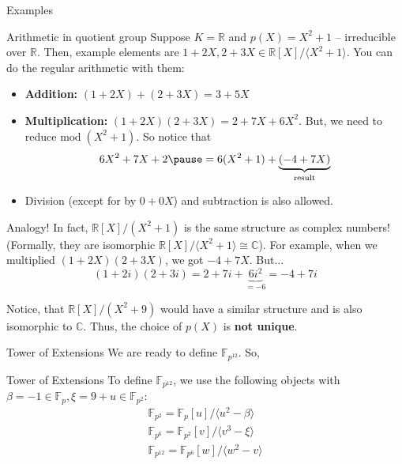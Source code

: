 \documentclass[xcolor={usenames,dvipsnames}]{beamer}
\begin{document}
    \begin{frame}{Examples}
        \begin{exampleblock}{Arithmetic in quotient group}
            Suppose $K=\mathbb{R}$ and $p(X)=X^2+1$ -- irreducible over $\mathbb{R}$. Then, example elements are $1+2X,2+3X \in \mathbb{R}[X]/\langle X^2+1 \rangle$. You can do the regular arithmetic with them:\pause
            \begin{itemize}
                \item \textbf{Addition:} $(1+2X)+(2+3X)=3+5X$ \pause
                \item \textbf{Multiplication:} $(1+2X)(2+3X)=2+7X+6X^2$. But, we need to reduce $\text{mod} \; (X^2+1)$. So notice that
                \begin{equation*}
                    6X^2+7X+2 \pause = 6(X^2+1) + \underbrace{(-4+7X)}_{\text{result}}
                \end{equation*}
                \item \pause Division (except for by $0+0X$) and subtraction is also allowed.
            \end{itemize}
        \end{exampleblock}
    \end{frame}

    \begin{frame}{Analogy!}
        In fact, $\mathbb{R}[X]/(X^2+1)$ is the same structure as complex numbers! (Formally, they are isomorphic $\mathbb{R}[X]/\langle X^2+1 \rangle \cong \mathbb{C}$). For example, when we multiplied $(1+2X)(2+3X)$, we got $-4+7X$. But...
        \begin{equation*}
            (1+2i)(2+3i) = 2 + 7i + \underbrace{6i^2}_{=-6} = -4 + 7i
        \end{equation*}
        
        \pause
        \vspace{10px}
        Notice, that $\mathbb{R}[X]/(X^2+9)$ would have a similar structure and is also isomorphic to $\mathbb{C}$. Thus, the choice of $p(X)$ is \textbf{not unique}.
    \end{frame}

    \begin{frame}{Tower of Extensions}
        We are ready to define $\mathbb{F}_{p^{12}}$. So,

        \begin{block}{Tower of Extensions}
        To define $\mathbb{F}_{p^{12}}$, we use the following objects with $\beta=-1 \in \mathbb{F}_p,\xi=9+u \in \mathbb{F}_{p^2}$:
        \begin{gather*}
            \mathbb{F}_{p^2} = \mathbb{F}_p[u] / \langle u^2 - \beta \rangle \\
            \mathbb{F}_{p^6} = \mathbb{F}_{p^2}[v] / \langle v^3 - \xi\rangle \\
            \mathbb{F}_{p^{12}} = \mathbb{F}_{p^6}[w] / \langle w^2 - v\rangle
        \end{gather*}
        \end{block}
    \end{frame}
\end{document}
